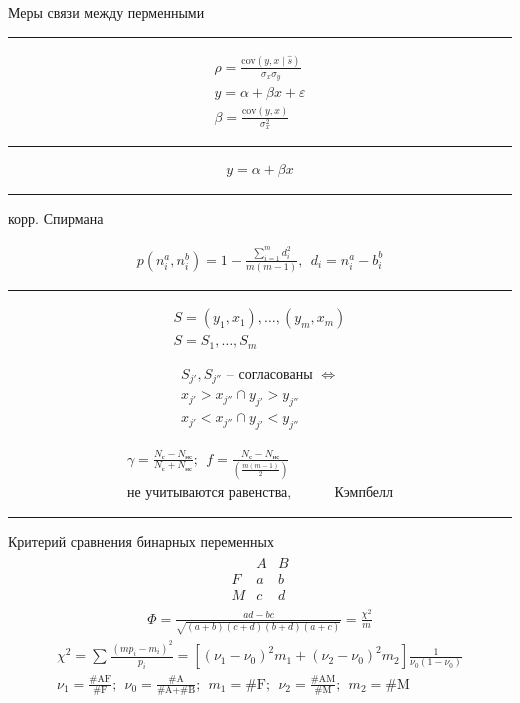 \documentclass{book}
\begin{document}
Меры связи между перменными
\hrule

\begin{gather*}
\rho=\frac{\mathrm{cov}(y,x\mid \hat{s})}{\sigma_x \sigma_y}\\
y=\alpha+\beta x+\varepsilon\\
\beta=\frac{\mathrm{cov}(y,x)}{\sigma_x^2}
\end{gather*}

\hrule

 \begin{gather*}
  y=\alpha+\beta x
\end{gather*}
\hrule

корр. Спирмана

\begin{gather*}
  p(n_i^a, n_i^b)=1-\frac{\sum_{i=1}^{m} {d_i^2}}{m(m-1)},~~d_i=n_i^a-b_i^{b}
\end{gather*}

\hrule
\begin{gather*}
    S={(y_1,x_1),\dots,(y_m,x_m)}\\
    S={S_1,\dots,S_m}
\end{gather*}

\begin{gather*}
    S_{j'}, S_{j''} \textrm{ -- согласованы } \Leftrightarrow\\
    x_{j'}>x_{j''} \cap y_{j'}>y_{j''}\\
    x_{j'}<x_{j''} \cap y_{j'}<y_{j''}
\end{gather*}

\begin{gather*}
  \gamma = \frac{N_\textrm{с}-N_\textrm{нс}}{N_\textrm{с}+N_\textrm{нс}};~~
  f=\frac{N_\textrm{с}-N_\textrm{нс}}{\left(\frac{m(m-1)}{2}\right)}\\
  \textrm{не учитываются равенства}, ~~~~~~~~~~~~~~\textrm{Кэмпбелл}
\end{gather*}
\hrule

Критерий сравнения бинарных переменных
\begin{gather*}
  \begin{matrix}
      &A&B\\
      F&a&b\\
      M&c&d
  \end{matrix}
\end{gather*}
\begin{gather*}
  \Phi = \frac{ad-bc}{\sqrt{(a+b)(c+d)(b+d)(a+c)}}=\frac{\chi^2}{m}
\end{gather*}
\begin{gather*}
    \chi^2=\sum_{}^{} {\frac{(mp_i-m_i)^2}{p_i}}
    =[(\nu_1-\nu_0)^2m_1+(\nu_2-\nu_0)^2m_2]\frac{1}{\nu_0(1-\nu_0)}\\
    \nu_1=\frac{\textrm{\#AF}}{\textrm{\#F}};~~
    \nu_0=\frac{\textrm{\#A}}{\textrm{\#A}+\textrm{\#B}};~~
    m_1=\textrm{#F};~~
    \nu_2=\frac{\textrm{\#AM}}{\textrm{\#M}};~~
    m_2=\textrm{#M}
\end{gather*}
\end{document}
